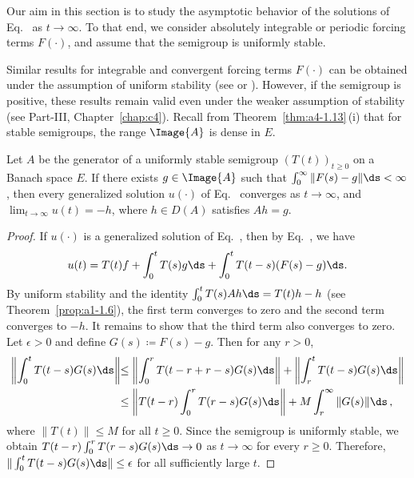 Our aim in this section is to study the asymptotic behavior of the solutions of Eq.~ as $t \to \infty$. 
To that end, we consider absolutely integrable or periodic forcing terms $F(\cdot)$, and assume that the semigroup
is uniformly stable.

Similar results for integrable and convergent forcing terms $F(\cdot)$ can
be obtained under the assumption of uniform stability (see \textcite[p.119]{pazy:1983} or \textcite{neubrander:1985b}). 
However, if the
semigroup is positive, these results remain valid even under the weaker assumption of stability (see Part-III, Chapter~\ref{chap:c4}).
Recall from Theorem~\ref{thm:a4-1.13}\,(i) that for stable
semigroups, the range $\Image{A}$ is dense in $E$.
\begin{theorem}\label{thm:a4-2.1}
Let $A$ be the generator of a uniformly stable semigroup
$(T(t))_{t \geq 0}$ on a Banach space $E$. 
If there exists $g \in \Image{A}$ such that
$\int_{0}^{\infty} \|F(s) - g\|  \ds < \infty$, then every generalized solution $u(\cdot)$ of
Eq.~ converges as $t \to \infty$, and $\lim_{t \to \infty} u(t) = -h$, where $h \in D(A)$ satisfies
$Ah = g$.
\end{theorem}
\begin{proof}
If\/ $u(\cdot)$ is a generalized solution of Eq.~, then by Eq.~, we have
\[
u(t) = T(t)f + \int_{0}^{t} T(s)g  \ds + \int_{0}^{t} T(t-s)(F(s)-g)  \ds.
\]
By uniform
stability and the identity $\int_0^t T(s)Ah \ds = T(t)h - h$ (see Theorem~\ref{prop:a1-1.6}), the first term converges to zero
and the second term converges to $-h$. 
It remains to show that the
third term also converges to zero. 
Let $\epsilon > 0$ and define $G(s) \coloneqq F(s)-g$. 
Then for any $r>0$,
\begin{align*}
\left\|\int_{0}^{t} T(t-s)G(s)  \ds\right\| & 
{\leq \left\|\int_{0}^{r} T(t-r+r-s)G(s)  \ds\right\| + \left\|\int_{r}^{t} T(t-s)G(s)  \ds\right\|}\\
& 
{\leq \left\|T(t-r)\int_{0}^{r} T(r-s)G(s)  \ds\right\| + M \int_{r}^{\infty} \|G(s)\|  \ds\,},
\end{align*}
where $\|T(t)\|\le M$ for all $t\ge 0$. Since the semigroup is uniformly stable, we obtain
$T(t-r)\int_{0}^{r} T(r-s)G(s)  \ds \to 0$ as $t \to \infty$ for every $r \geq 0$.
Therefore, $\|\int_{0}^{t} T(t-s)G(s)  \ds\| \leq \epsilon$ for all sufficiently large $t$.
\end{proof}

